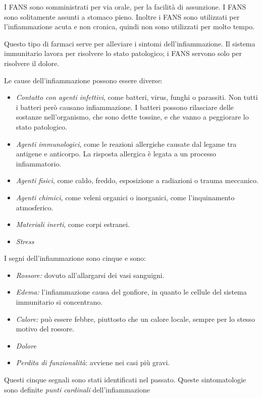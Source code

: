 I FANS sono somministrati per via orale, per la facilità di assunzione. I
FANS sono solitamente assunti a stomaco pieno. Inoltre i FANS sono
utilizzati per l'infiammazione acuta e non cronica, quindi non sono
utilizzati per molto tempo.

Questo tipo di farmaci serve per alleviare i sintomi dell'infiammazione.
Il sistema immunitario lavora per risolvere lo stato patologico; i FANS
servono solo per risolvere il dolore.

Le cause dell'infiammazione possono essere diverse:

\begin{itemize}
\item
\emph{Contatto con agenti infettivi}, come batteri,
virus,
funghi o parassiti. Non tutti i batteri però causano infiammazione. I
batteri possono rilasciare delle sostanze nell'organismo, che sono
dette tossine, e che vanno a peggiorare lo stato patologico.
\item
\emph{Agenti immunologici}, come le reazioni allergiche causate dal
legame tra antigene e anticorpo. La risposta allergica è legata a un
processo infiammatorio.
\item
\emph{Agenti fisici}, come caldo, freddo, esposizione a radiazioni o
trauma meccanico.
\item
\emph{Agenti chimici}, come veleni organici o inorganici, come
l'inquinamento atmosferico.
\item
\emph{Materiali inerti}, come corpi estranei.
\item
\emph{Stress}
\end{itemize}

I segni dell'infiammazione sono cinque e sono:

\begin{itemize}
\item
\emph{Rossore:} dovuto all'allargarsi dei vasi sanguigni.
\item
\emph{Edema:} l'infiammazione causa del gonfiore, in quanto le cellule
del sistema immunitario si concentrano.
\item
\emph{Calore:} può essere febbre, piuttosto che un calore locale,
sempre per lo stesso motivo del rossore.
\item
\emph{Dolore}
\item
\emph{Perdita di funzionalità}: avviene nei casi più gravi.
\end{itemize}

Questi cinque segnali sono stati identificati nel passato. Queste
sintomatologie sono definite \emph{punti cardinali} dell'infiammazione

